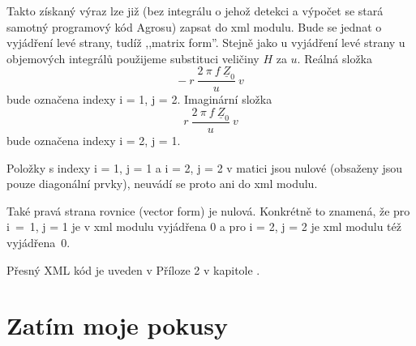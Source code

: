 \documentclass[12pt,a4paper,oneside]{article}
\numberwithin{equation}{section} %
\numberwithin{figure}{section} %
\numberwithin{table}{section} %
\newcommand{\faz}[1]{{\underline{#1}}} %
\begin{document}
Takto získaný výraz lze již (bez integrálu o jehož detekci a výpočet se stará samotný programový kód Agrosu) zapsat do xml modulu. Bude se jednat o vyjádření levé strany, tudíž ,,matrix form''. Stejně jako u vyjádření levé strany u objemových integrálů použijeme substituci veličiny $H$ za $u$. Reálná složka 
\begin{equation}
- ~ r ~ \frac{2 ~ \pi ~ f ~ \faz{Z} _0}{u} ~ v
\end{equation} 
bude označena indexy i = 1, j = 2. Imaginární složka 
\begin{equation}
r ~ \frac{2 ~ \pi ~ f ~ \faz{Z} _0}{u} ~ v
\end{equation}
bude označena indexy i = 2, j = 1.

Položky s indexy i = 1, j = 1 a i = 2, j = 2 v matici jsou nulové (obsaženy jsou pouze diagonální prvky), neuvádí se proto ani do xml modulu.

Také pravá strana rovnice (vector form) je nulová. Konkrétně to znamená, že pro i~=~1, j = 1 je v xml modulu vyjádřena $0$ a pro i = 2, j = 2 je xml modulu též vyjádřena~$0$.

Přesný XML kód je uveden v Příloze 2 v kapitole .





\clearpage
\section{Zatím moje pokusy}
\end{document}
